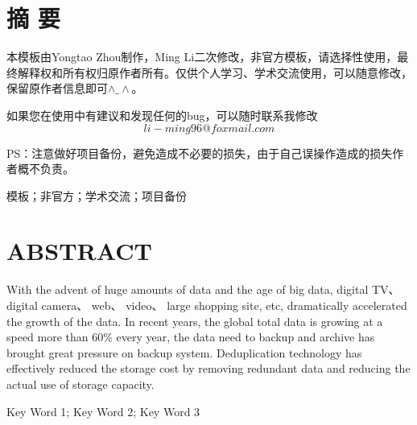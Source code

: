 \frontmatter {}  %

\chapter*{摘\texorpdfstring{\qquad}{} 要}
\thispagestyle{main}

\par 本模板由Yongtao Zhou制作，Ming Li二次修改，非官方模板，请选择性使用，最终解释权和所有权归原作者所有。仅供个人学习、学术交流使用，可以随意修改，保留原作者信息即可$\wedge\_\wedge$。
\par 如果您在使用中有建议和发现任何的bug，可以随时联系我修改
$$li-ming96@foxmail.com$$
\par PS：注意做好项目备份，避免造成不必要的损失，由于自己误操作造成的损失作者概不负责。


\bigskip
{} 模板；非官方；学术交流；项目备份


\chapter*{\bfseries ABSTRACT}
\thispagestyle{main}

\par With the advent of huge amounts of data and the age of big data, digital TV、 digital
camera、 web、 video、 large shopping site, etc, dramatically accelerated the growth of the data. In recent years, the global total data is growing at a speed more than 60\% every year, the data need to backup and archive has brought great pressure on backup system. Deduplication technology has effectively reduced the storage cost by removing redundant data and reducing the actual use of storage capacity.

\bigskip
{}Key Word 1; Key Word 2; Key Word 3
